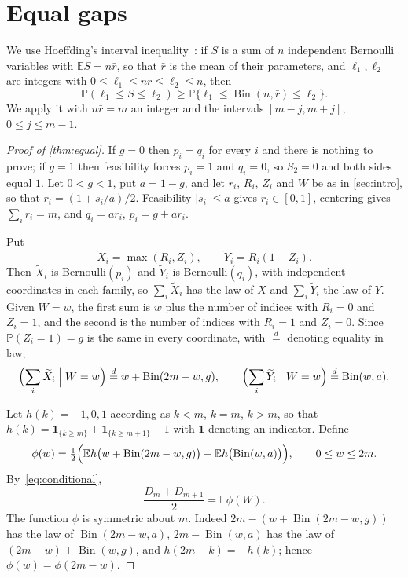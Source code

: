 \documentclass[11pt,a4paper]{article}
\numberwithin{equation}{section}
\theoremstyle{remark}
\newcommand{\Pp}{\mathbb P}
\newcommand{\E}{\mathbb E}
\newcommand{\Bin}{\operatorname{Bin}}
\begin{document}
\section{Equal gaps}\label{sec:equal}

We use Hoeffding's interval inequality~\cite[Theorem~5]{Hoeffding}: if $S$ is a sum of $n$ independent Bernoulli variables with $\E S=n\bar r$, so that $\bar r$ is the mean of their parameters, and $\ell_1,\ell_2$ are integers with $0\le \ell_1\le n\bar r\le \ell_2\le n$, then
\begin{equation}\label{eq:hoeffding}
\Pp(\ell_1\le S\le \ell_2)\ge\Pp\{\ell_1\le\Bin(n,\bar r)\le \ell_2\}.
\end{equation}
We apply it with $n\bar r=m$ an integer and the intervals $[m-j,m+j]$, $0\le j\le m-1$.

\begin{proof}[Proof of \cref{thm:equal}]
If $g=0$ then $p_i=q_i$ for every $i$ and there is nothing to prove; if $g=1$ then feasibility forces $p_i=1$ and $q_i=0$, so $S_2=0$ and both sides equal $1$. Let $0<g<1$, put $a=1-g$, and let $r_i$, $R_i$, $Z_i$ and $W$ be as in \cref{sec:intro}, so that $r_i=(1+s_i/a)/2$. Feasibility $|s_i|\le a$ gives $r_i\in[0,1]$, centering gives $\sum_i r_i=m$, and $q_i=ar_i$, $p_i=g+ar_i$.

Put
\[
\widetilde X_i=\max(R_i,Z_i),\qquad \widetilde Y_i=R_i(1-Z_i).
\]
Then $\widetilde X_i$ is Bernoulli$(p_i)$ and $\widetilde Y_i$ is Bernoulli$(q_i)$, with independent coordinates in each family, so $\sum_i\widetilde X_i$ has the law of $X$ and $\sum_i\widetilde Y_i$ the law of $Y$. Given $W=w$, the first sum is $w$ plus the number of indices with $R_i=0$ and $Z_i=1$, and the second is the number of indices with $R_i=1$ and $Z_i=0$. Since $\Pp(Z_i=1)=g$ is the same in every coordinate, with $\overset d=$ denoting equality in law,
\begin{equation}\label{eq:conditional}
\Bigl(\sum_i\widetilde X_i\Bigm| W=w\Bigr)\overset d=w+\Bin(2m-w,g),\qquad
\Bigl(\sum_i\widetilde Y_i\Bigm| W=w\Bigr)\overset d=\Bin(w,a).
\end{equation}

Let $h(k)=-1,0,1$ according as $k<m$, $k=m$, $k>m$, so that $h(k)=\mathbf 1_{\{k\ge m\}}+\mathbf 1_{\{k\ge m+1\}}-1$ with $\mathbf 1$ denoting an indicator. Define
\[
\phi(w)=\tfrac12\Bigl(\E h\bigl(w+\Bin(2m-w,g)\bigr)-\E h\bigl(\Bin(w,a)\bigr)\Bigr),\qquad 0\le w\le 2m .
\]
By~\eqref{eq:conditional},
\begin{equation}\label{eq:average}
\frac{D_m+D_{m+1}}2=\E\phi(W).
\end{equation}
The function $\phi$ is symmetric about $m$. Indeed $2m-(w+\Bin(2m-w,g))$ has the law of $\Bin(2m-w,a)$, $2m-\Bin(w,a)$ has the law of $(2m-w)+\Bin(w,g)$, and $h(2m-k)=-h(k)$; hence $\phi(w)=\phi(2m-w)$.


\end{proof}
\end{document}
